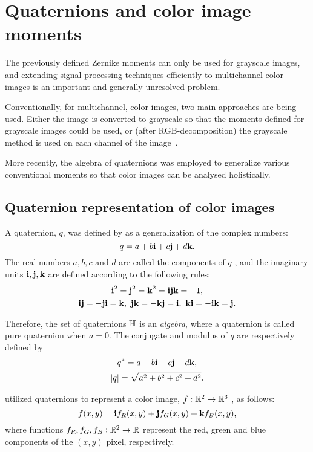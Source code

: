 \section{Quaternions and color image moments}
The previously defined Zernike moments can only be used for grayscale images, and extending signal processing techniques efficiently to multichannel color images is an important and generally unresolved problem.

Conventionally, for multichannel, color images, two main approaches are being used. Either the image is converted to grayscale so that the moments defined for grayscale images could be used, or (after RGB-decomposition) the grayscale method is used on each channel of the image~\cite{affine_color}.

More recently, the algebra of quaternions was employed to generalize various conventional moments so that color images can be analysed holistically.

\subsection{Quaternion representation of color images}

A quaternion, $q$, was defined by \citeauthor{Hamilton} \cite{Hamilton} as a generalization of the complex numbers: 
\[
	q = a+b\textbf{i} +c\textbf{j}+d\textbf{k}.
\]
The real numbers $a , b , c$ and $d$ are called the components of $q$ , and the imaginary units $\textbf{i} , \textbf{j}, \textbf{k}$ are defined according to the following rules:
\[
\begin{gathered}
	\textbf{i}^2 = \textbf{j}^2 = \textbf{k}^2 = \textbf{i}\textbf{j}\textbf{k} = -1,\\
	\textbf{i}\textbf{j} = -\textbf{j}\textbf{i} = \textbf{k},\ \textbf{j}\textbf{k} = -\textbf{k}\textbf{j} = \textbf{i},\ \textbf{k}\textbf{i} = -\textbf{i}\textbf{k} = \textbf{j}.
\end{gathered}
\]

Therefore, the set of quaternions $\mathbb{H}$ is an \textit{algebra}, where a quaternion is called pure quaternion when $a=0$. 
The conjugate and modulus of $q$ are respectively defined by 
\[
\begin{gathered}
q^* = a-b\textbf{i}-c\textbf{j}-d\textbf{k}, \\
|q| = \sqrt{a^2+b^2+c^2+d^2}.
\end{gathered}
\]

\citeauthor{EllSangwine} \cite{EllSangwine} utilized quaternions to represent a color image, $f: \mathbb{R}^2\to\mathbb{R}^3$ , as follows:
\[
f(x,y) = \textbf{i} f_R(x,y) + \textbf{j} f_G(x,y) + \textbf{k} f_B(x,y),
\]
where functions $f_R , f_G, f_B:\mathbb{R}^2\to\mathbb{R}$ represent the red, green and blue components of the $(x,y)$ pixel, respectively.

